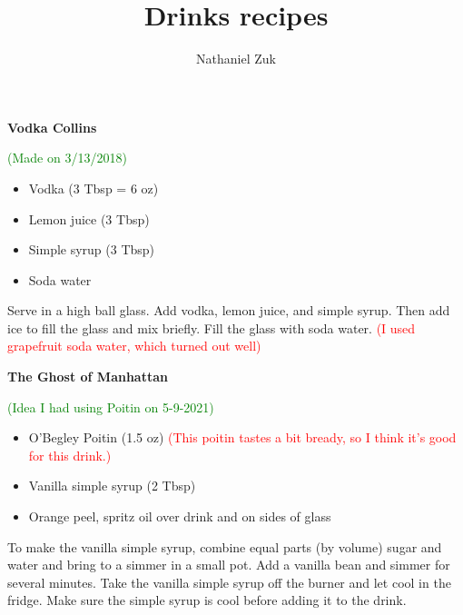 \documentclass[11pt]{article}
\title{Drinks recipes}
\author{Nathaniel Zuk}
\begin{document}
\maketitle

\textbf{Vodka Collins}

\textcolor{green}{(Made on 3/13/2018)}

\begin{itemize}
\item Vodka (3 Tbsp = 6 oz)
\item Lemon juice (3 Tbsp)
\item Simple syrup (3 Tbsp)
\item Soda water
\end{itemize}

Serve in a high ball glass.  Add vodka, lemon juice, and simple syrup.  Then add ice to fill the glass and mix briefly.  Fill the  glass with soda water.  \textcolor{red}{(I used grapefruit soda water, which turned out well)}

\textbf{The Ghost of Manhattan}

\textcolor{green}{(Idea I had using Poitin on 5-9-2021)}

\begin{itemize}
\item O'Begley Poitin (1.5 oz) \textcolor{red}{(This poitin tastes a bit bready, so I think it's good for this drink.)}
\item Vanilla simple syrup (2 Tbsp)
\item Orange peel, spritz oil over drink and on sides of glass
\end{itemize}

To make the vanilla simple syrup, combine equal parts (by volume) sugar and water and bring to a simmer in a small pot. Add a vanilla bean and simmer for several minutes. Take the vanilla simple syrup off the burner and let cool in the fridge. Make sure the simple syrup is cool before adding it to the drink.
\end{document}
